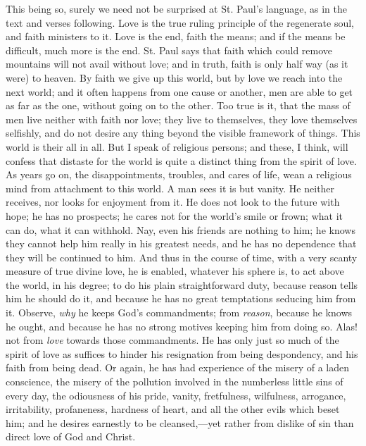 This being so, surely we need not be surprised at St. Paul's
language, as in the text and verses following. Love is the true ruling
principle of the regenerate soul, and faith ministers to it. Love is
the end, faith the means; and if the means be difficult, much more is
the end. St. Paul says that faith which could remove mountains will
not avail without love; and in truth, faith is only half way (as it
were) to heaven. By faith we give up this world, but by love we reach
into the next world; and it often happens from one cause or another,
men are able to get as far as the one, without going on to the other.
Too true is it, that the mass of men live neither with faith nor love;
they live to themselves, they love themselves selfishly, and do not
desire any thing beyond the visible framework of things. This world is
their all in all. But I speak of religious persons; and these, I
think, will confess that distaste for the world is quite a distinct
thing from the spirit of love. As years go on, the disappointments,
troubles, and cares of life, wean a religious mind from attachment to
this world. A man sees it is but vanity. He neither receives, nor
looks for enjoyment from it. He does not look to the future with hope;
he has no prospects; he cares not for the world's smile or frown;
what it can do, what it can withhold. Nay, even his friends are
nothing to him; he knows they cannot help him really in his greatest
needs, and he has no dependence that they will be continued to him.
And thus in the course of time, with a very scanty measure of true
divine love, he is enabled, whatever his sphere is, to act above the
world, in his degree; to do his plain straightforward duty, because
reason tells him he should do it, and because he has no great
temptations seducing him from it. Observe, \emph{why} he keeps God's
commandments; from \emph{reason}, because he knows he ought, and
because he has no strong motives keeping him from doing so. Alas! not
from \emph{love} towards those commandments. He has only just so much
of the spirit of love as suffices to hinder his resignation from being
despondency, and his faith from being dead. Or again, he has had
experience of the misery of a laden conscience, the misery of the
pollution involved in the numberless little sins of every day, the
odiousness of his pride, vanity, fretfulness, wilfulness, arrogance,
irritability, profaneness, hardness of heart, and all the other evils
which beset him; and he desires earnestly to be cleansed,—yet rather
from dislike of sin than direct love of God and Christ.

